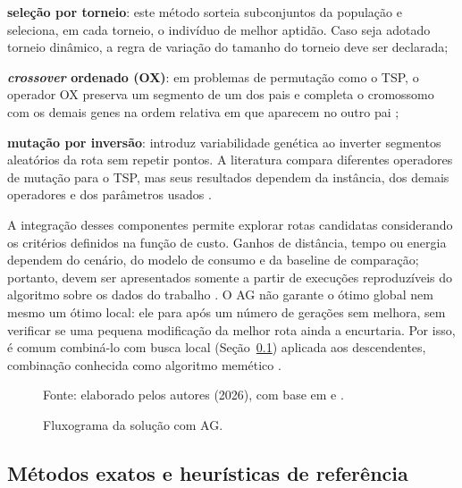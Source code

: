 \begin{alineastcc}
    \item \textbf{seleção por torneio}: este método sorteia subconjuntos da população e seleciona, em cada torneio, o indivíduo de melhor aptidão. Caso seja adotado torneio dinâmico, a regra de variação do tamanho do torneio deve ser declarada;
    \item \textbf{\textit{crossover} ordenado (OX)}: em problemas de permutação como o TSP, o operador OX preserva um segmento de um dos pais e completa o cromossomo com os demais genes na ordem relativa em que aparecem no outro pai \cite{dalkilic2025};
    \item \textbf{mutação por inversão}: introduz variabilidade genética ao inverter segmentos aleatórios da rota sem repetir pontos. A literatura compara diferentes operadores de mutação para o TSP, mas seus resultados dependem da instância, dos demais operadores e dos parâmetros usados \cite{ahmed2024}.
\end{alineastcc}

A integração desses componentes permite explorar rotas candidatas considerando os critérios definidos na função de custo. Ganhos de distância, tempo ou energia dependem do cenário, do modelo de consumo e da baseline de comparação; portanto, devem ser apresentados somente a partir de execuções reproduzíveis do algoritmo sobre os dados do trabalho \cite{shivgan2020,wu2024}. O AG não garante o ótimo global nem mesmo um ótimo local: ele para após um número de gerações sem melhora, sem verificar se uma pequena modificação da melhor rota ainda a encurtaria. Por isso, é comum combiná-lo com busca local (Seção~\ref{subsec:rotas_referencias}) aplicada aos descendentes, combinação conhecida como algoritmo memético \cite{moscato1989}.

\begin{figure}[H]
    \centering
    \caption{Fluxograma da solução com AG.}
    \label{fig:fluxograma_ag}
    
    \par\vspace{0.2cm}
    \centering\footnotesize Fonte: elaborado pelos autores (2026), com base em  e .
\end{figure}

\subsection{Métodos exatos e heurísticas de referência}\label{subsec:rotas_referencias}

